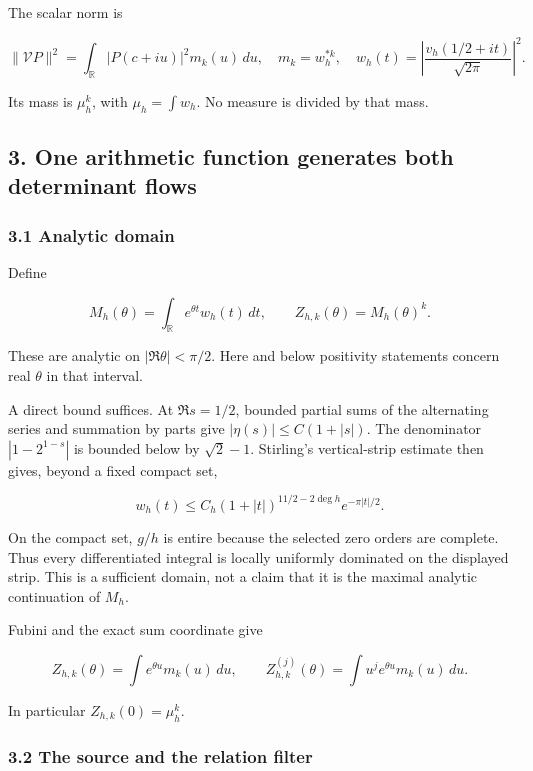The scalar norm is

\[
\|\mathcal VP\|^2=\int_{\mathbb R}|P(c+iu)|^2m_k(u)\,du,
\quad m_k=w_h^{*k},\quad
w_h(t)=\left|\frac{v_h(1/2+it)}{\sqrt{2\pi}}\right|^2.
\tag{6}
\]

Its mass is \(\mu_h^k\), with \(\mu_h=\int w_h\). No measure is divided
by that mass.

\subsection{3. One arithmetic function generates both determinant
flows}\label{toda_volume:one-arithmetic-function-generates-both-determinant-flows}

\subsubsection{3.1 Analytic domain}\label{toda_volume:analytic-domain}

Define

\[
M_h(\theta)=\int_{\mathbb R}e^{\theta t}w_h(t)\,dt,
\qquad Z_{h,k}(\theta)=M_h(\theta)^k.
\tag{7}
\]

These are analytic on \(|\Re\theta|<\pi/2\). Here and below positivity
statements concern real \(\theta\) in that interval.

A direct bound suffices. At \(\Re s=1/2\), bounded partial sums of the
alternating series and summation by parts give
\(|\eta(s)|\le C(1+|s|)\). The denominator \(|1-2^{1-s}|\) is bounded
below by \(\sqrt2-1\). Stirling's vertical-strip estimate then gives,
beyond a fixed compact set,

\[
w_h(t)\le C_h(1+|t|)^{11/2-2\deg h}e^{-\pi|t|/2}.
\]

On the compact set, \(g/h\) is entire because the selected zero orders
are complete. Thus every differentiated integral is locally uniformly
dominated on the displayed strip. This is a sufficient domain, not a
claim that it is the maximal analytic continuation of \(M_h\).

Fubini and the exact sum coordinate give

\[
Z_{h,k}(\theta)=\int e^{\theta u}m_k(u)\,du,
\qquad
Z_{h,k}^{(j)}(\theta)=\int u^je^{\theta u}m_k(u)\,du.
\tag{8}
\]

In particular \(Z_{h,k}(0)=\mu_h^k\).

\subsubsection{3.2 The source and the relation
filter}\label{toda_volume:the-source-and-the-relation-filter}

